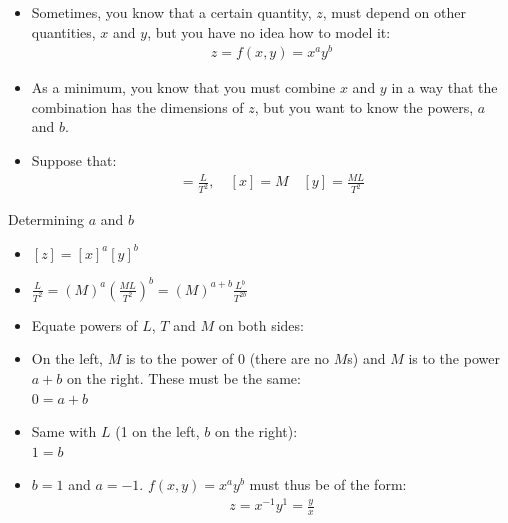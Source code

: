 \documentclass[aspectratio=169,
hyperref={colorlinks,urlcolor=blue}
]{beamer}
\begin{document}
{
\begin{itemize}
\item Sometimes, you know that a certain quantity, $z$, must depend on other quantities, $x$ and $y$, but you have no idea how to model it:
\begin{eqnarray*}
z=f(x,y)=x^ay^b
\end{eqnarray*}
\item As a minimum, you know that you must combine $x$ and $y$ in a way that the combination has the dimensions of $z$, but you want to know the powers, $a$ and $b$. 
\item Suppose that:
\begin{eqnarray*}
[z]=\frac{L}{T^2},\quad [x]=M\quad [y]=\frac{ML}{T^2}
\end{eqnarray*}
\end{itemize}
}
{
\begin{exampleblock}{Determining $a$ and $b$}
\begin{itemize}
\item<1-> $[z] = [x]^a[y]^b$
\item<2-> $\frac{L}{T^2}=(M)^a\left(\frac{ML}{T^2} \right)^b=(M)^{a+b}\frac{L^{b}}{T^{2b}}$
\item<3->[$\rightarrow$] Equate powers of $L$, $T$ and $M$ on both sides:
\item<4-> On the left, $M$ is to the power of 0 (there are no $M$s) and $M$ is to the power $a+b$ on the right. These must be the same:\\
$0=a+b$
\item<5-> Same with $L$ (1 on the left, $b$ on the right):\\
$1=b$
\item<6->[$\rightarrow$] $b=1$ and $a=-1$. $f(x,y)=x^ay^b$ must thus be of the form:
\begin{eqnarray*}
z = x^{-1}y^{1}=\frac{y}{x}
\end{eqnarray*}
\end{itemize}

\end{exampleblock}
}







\end{document}
